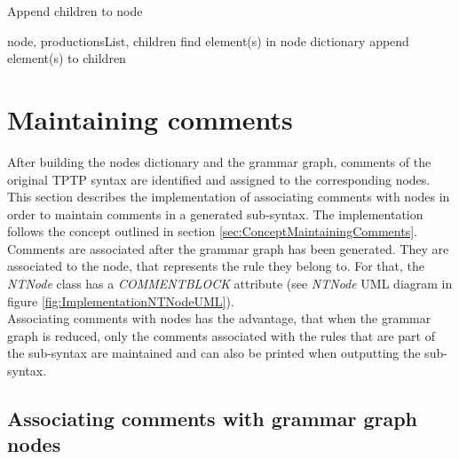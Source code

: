 \begin{algorithm}[H]
\caption{Append children to node}
\begin{algorithmic}[1] 
\Require node, productionsList, children
		\State find element(s) in node dictionary
		\State append element(s) to children
	\EndIf
\EndFor
\end{algorithmic}
\end{algorithm}

\section{Maintaining comments}\label{sec:ImplementationMaintainingComments}

After building the nodes dictionary and the grammar graph, comments of the original \ac{TPTP} syntax are identified and assigned to the corresponding nodes.
This section describes the implementation of associating comments with nodes in order to maintain comments in a generated sub-syntax.
The implementation follows the concept outlined in section \ref{sec:ConceptMaintainingComments}.
Comments are associated after the grammar graph has been generated.
They are associated to the node, that represents the rule they belong to.
For that, the \textit{NTNode} class has a \textit{COMMENT\textunderscore BLOCK} attribute (see \textit{NTNode} UML diagram in figure \ref{fig:ImplementationNTNodeUML}).\\
Associating comments with nodes has the advantage, that when the grammar graph is reduced, only the comments associated with the rules that are part of the sub-syntax are maintained and can also be printed when outputting the sub-syntax.\\

\subsection{Associating comments with grammar graph nodes}\label{sec:ImplementationMaintainingCommentsAssociateWithNodes}

